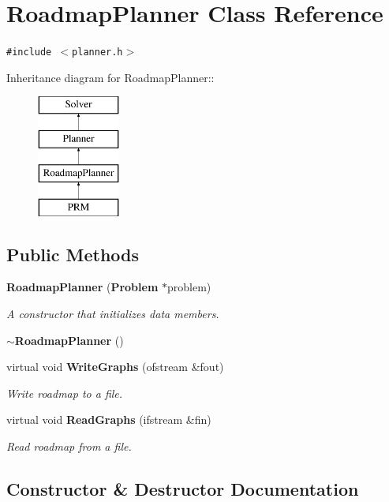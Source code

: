 \section{Roadmap\-Planner  Class Reference}
\label{class_RoadmapPlanner}
{\tt \#include $<$planner.h$>$}

Inheritance diagram for Roadmap\-Planner::\begin{figure}[H]
\begin{center}
\leavevmode
\includegraphics[height=4cm]{class_RoadmapPlanner}
\end{center}
\end{figure}
\subsection*{Public Methods}
\begin{CompactItemize}
\item 
{\bf Roadmap\-Planner} ({\bf Problem} $\ast$problem)
\begin{CompactList}\small\item\em A constructor that initializes data members.\item\end{CompactList}\item 
{\bf $\sim$Roadmap\-Planner} ()
\item 
virtual void {\bf Write\-Graphs} (ofstream \&fout)
\begin{CompactList}\small\item\em Write roadmap to a file.\item\end{CompactList}\item 
virtual void {\bf Read\-Graphs} (ifstream \&fin)
\begin{CompactList}\small\item\em Read roadmap from a file.\item\end{CompactList}\end{CompactItemize}


\subsection{Constructor \& Destructor Documentation}
